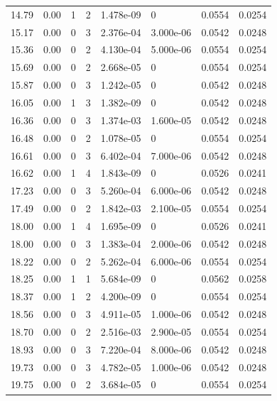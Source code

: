 \documentclass[preview]{standalone}
\begin{document}
{{{\begin{tabular}{L{1.2cm}C{1.2cm} C{0.3cm}C{0.5cm} C{1.4cm}C{1.4cm} C{1.4cm}C{1.4cm}}
  14.79  &  0.00  & 1     &  2 &  1.478e-09  & 0  & 0.0554 &  0.0254   \\ 
  15.17  &  0.00  & 0     &  3 &  2.376e-04  & 3.000e-06  & 0.0542 &  0.0248   \\ 
  15.36  &  0.00  & 0     &  2 &  4.130e-04  & 5.000e-06  & 0.0554 &  0.0254   \\ 
  15.69  &  0.00  & 0     &  2 &  2.668e-05  & 0  & 0.0554 &  0.0254   \\ 
  15.87  &  0.00  & 0     &  3 &  1.242e-05  & 0  & 0.0542 &  0.0248   \\ 
  16.05  &  0.00  & 1     &  3 &  1.382e-09  & 0  & 0.0542 &  0.0248   \\ 
  16.36  &  0.00  & 0     &  3 &  1.374e-03  & 1.600e-05  & 0.0542 &  0.0248   \\ 
  16.48  &  0.00  & 0     &  2 &  1.078e-05  & 0  & 0.0554 &  0.0254   \\ 
  16.61  &  0.00  & 0     &  3 &  6.402e-04  & 7.000e-06  & 0.0542 &  0.0248   \\ 
  16.62  &  0.00  & 1     &  4 &  1.843e-09  & 0  & 0.0526 &  0.0241   \\ 
  17.23  &  0.00  & 0     &  3 &  5.260e-04  & 6.000e-06  & 0.0542 &  0.0248   \\ 
  17.49  &  0.00  & 0     &  2 &  1.842e-03  & 2.100e-05  & 0.0554 &  0.0254   \\ 
  18.00  &  0.00  & 1     &  4 &  1.695e-09  & 0  & 0.0526 &  0.0241   \\ 
  18.00  &  0.00  & 0     &  3 &  1.383e-04  & 2.000e-06  & 0.0542 &  0.0248   \\ 
  18.22  &  0.00  & 0     &  2 &  5.262e-04  & 6.000e-06  & 0.0554 &  0.0254   \\ 
  18.25  &  0.00  & 1     &  1 &  5.684e-09  & 0  & 0.0562 &  0.0258   \\ 
  18.37  &  0.00  & 1     &  2 &  4.200e-09  & 0  & 0.0554 &  0.0254   \\ 
  18.56  &  0.00  & 0     &  3 &  4.911e-05  & 1.000e-06  & 0.0542 &  0.0248   \\ 
  18.70  &  0.00  & 0     &  2 &  2.516e-03  & 2.900e-05  & 0.0554 &  0.0254   \\ 
  18.93  &  0.00  & 0     &  3 &  7.220e-04  & 8.000e-06  & 0.0542 &  0.0248   \\ 
  19.73  &  0.00  & 0     &  3 &  4.782e-05  & 1.000e-06  & 0.0542 &  0.0248   \\ 
  19.75  &  0.00  & 0     &  2 &  3.684e-05  & 0  & 0.0554 &  0.0254   \\ 

\end{tabular}}}}
\end{document}
